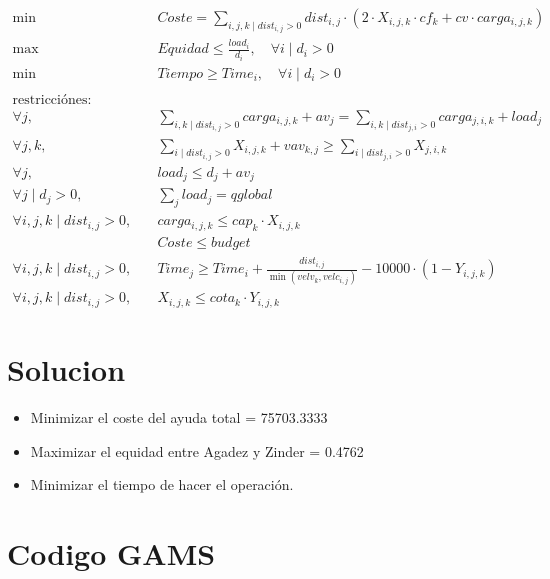 \documentclass[]{article}
\begin{document}
\begin{align*}
	\min \; & Coste = \sum_{i,j,k \mid dist_{i,j} > 0} dist_{i,j}\cdot (2\cdot X_{i,j,k}\cdot cf_{k}+cv\cdot carga_{i,j,k})\\
	\max \; & Equidad \leq  \frac{load_i}{d_i}, \quad \forall i \mid d_i > 0\\
	\min \; & Tiempo \geq Time_i, \quad \forall i \mid d_i > 0\\ \\
	\text{restricciónes:}&\\
	\forall j, \quad &\sum_{i,k \mid dist_{i,j} > 0} carga_{i,j,k} + av_j = \sum_{i,k \mid dist_{j,i} > 0}  carga_{j,i,k} + load_j\\
	\forall j,k, \quad &\sum_{i \mid dist_{i,j} > 0} X_{i,j,k} + vav_{k,j} \geq \sum_{i \mid dist_{j,i} > 0} X_{j,i,k}\\
	\forall j, \quad &load_j \leq d_j + av_j\\
	\forall j \mid d_j > 0, \quad &\sum_j load_j = qglobal\\
	\forall i,j,k \mid dist_{i,j} > 0, \quad & carga_{i,j,k} \leq cap_k \cdot X_{i,j,k}\\
	& Coste \leq budget\\
	\forall i,j,k \mid dist_{i,j} > 0, \quad & Time_j \geq Time_i + \frac{dist_{i,j}}{\min(velv_k, velc_{i,j})} - 10000\cdot (1-Y_{i,j,k})\\
	\forall i,j,k \mid dist_{i,j} > 0, \quad & X_{i,j,k} \leq cota_k \cdot Y_{i,j,k}
\end{align*}

\section{Solucion}
\begin{itemize}
	\item Minimizar el coste del ayuda total = 75703.3333
	\item Maximizar el equidad entre Agadez y Zinder = 0.4762
	\item Minimizar el tiempo de hacer el operación.
\end{itemize}
\section{Codigo GAMS}
\end{document}
